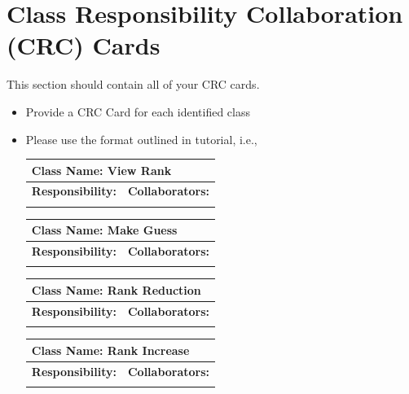 \documentclass[]{article}
\begin{document}
	
\section{Class Responsibility Collaboration (CRC) Cards}
\label{sec:class_responsibility_collaboration_crc_cards}
This section should contain all of your CRC cards.

\begin{itemize}
	\item Provide a CRC Card for each identified class
	\item Please use the format outlined in tutorial, i.e.,
	\begin{table}[ht]
		\centering
		\begin{tabular}{|p{5cm}|p{5cm}|}
		\hline 
		 \multicolumn{2}{|l|}{\textbf{Class Name:} View Rank} \\
		\hline
		\textbf{Responsibility:} & \textbf{Collaborators:} \\
		\hline
		\vspace{1in} & \\
		\hline
		\end{tabular}
	\end{table}

	\begin{table}
		\centering
		\begin{tabular}{|p{5cm}|p{5cm}|}
		\hline 
		 \multicolumn{2}{|l|}{\textbf{Class Name:} Make Guess} \\
		\hline
		\textbf{Responsibility:} & \textbf{Collaborators:} \\
		\hline
		\vspace{1in} & \\
		\hline
		\end{tabular}
	\end{table}
	
	\begin{table}
		\centering
		\begin{tabular}{|p{5cm}|p{5cm}|}
		\hline 
		 \multicolumn{2}{|l|}{\textbf{Class Name:} Rank Reduction} \\
		\hline
		\textbf{Responsibility:} & \textbf{Collaborators:} \\
		\hline
		\vspace{1in} & \\
		\hline
		\end{tabular}
	\end{table}

	\begin{table}
		\centering
		\begin{tabular}{|p{5cm}|p{5cm}|}
		\hline 
		 \multicolumn{2}{|l|}{\textbf{Class Name:} Rank Increase} \\
		\hline
		\textbf{Responsibility:} & \textbf{Collaborators:} \\
		\hline
		\vspace{1in} & \\
		\hline
		\end{tabular}
	\end{table}


\end{itemize}
\end{document}
